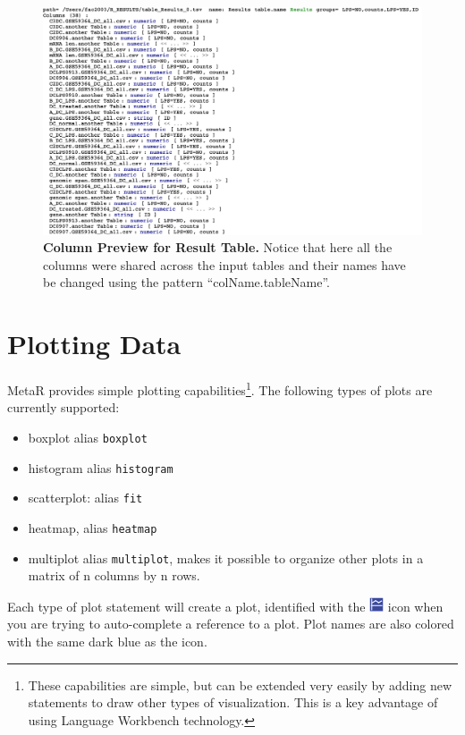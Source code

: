 \begin{figure}[h!tbp]
  \centering
  \includegraphics[width=\figWidthWide]{figures/ExampleJoinColumnPreview.pdf}
\caption[Column Preview for Result Table.]{\textbf{Column Preview for Result Table.} Notice that here all the columns were shared across the input tables and their names have be changed using the pattern ``colName.tableName''.}
\label{fig:ColumnPreviewExample}
\end{figure}


\section{Plotting Data}
MetaR provides simple plotting capabilities\footnote{These capabilities are simple, but can be extended very easily by adding new statements to draw other types of visualization. This is a key advantage of using Language Workbench technology.}. The following types of plots are currently supported: 
\begin{itemize}
  \item boxplot alias \texttt{boxplot}
  \item histogram alias \texttt{histogram}
  \item scatterplot: alias \texttt{fit}
  \item heatmap, alias \texttt{heatmap}
  \item multiplot alias \texttt{multiplot}, makes it possible to organize other plots in a matrix of n columns by n rows.
\end{itemize}
Each type of plot statement will create a plot, identified with the \includegraphics[height=2ex]{figures/plot.png} icon when you are trying to auto-complete a reference to a plot. Plot names are also colored with the same dark blue as the icon.

